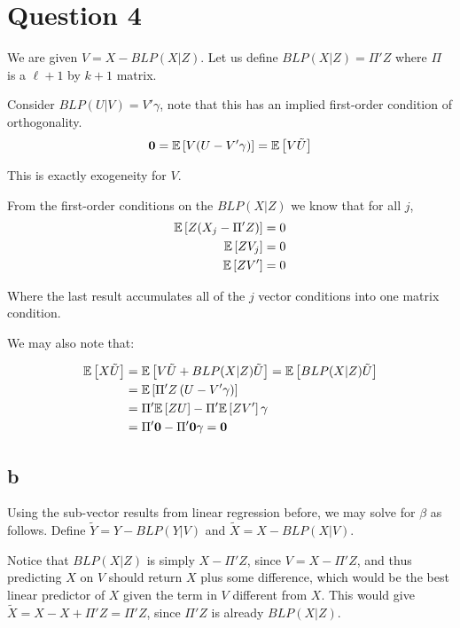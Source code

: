 \documentclass[12pt]{paper}
\begin{document}
\section*{Question 4}

We are given $V = X - BLP(X \vert Z)$. Let us define
$BLP(X \vert Z) = \Pi' Z$ where $\Pi$ is a $\ell+1$ by $k +1$ matrix.

Consider $BLP( U \vert V) = V' \gamma$, note that this has an implied
first-order condition of orthogonality.
\begin{equation*}
  \bm{ 0 } = \mathbb{E} \left [  V ( U - V' \gamma) \right ] = \mathbb{E} \left [  V \tilde{U} \right ]
\end{equation*}

This is exactly exogeneity for $V$.

From the first-order conditions on the $BLP( X \vert Z)$ we know that for
all $j$,
\begin{align*}
  \mathbb{E} \left [  Z ( X_j - \Pi' Z) \right ] &= 0\\
  \mathbb{E} \left [  Z V_j  \right ] &= 0\\
  \mathbb{E} \left [  Z V' \right ] &= 0
\end{align*}

Where the last result accumulates all of the $j$ vector conditions
into one matrix condition.

We may also note that:

\begin{align*}
  \mathbb{E} \left [  X \tilde{U} \right ] &= \mathbb{E} \left [  V \tilde{U} + BLP( X \vert Z) \tilde{U} \right ] =
                       \mathbb{E} \left [  BLP( X \vert Z) \tilde{U} \right ]\\
  &=\mathbb{E} \left [   \Pi' Z \left( U - V'\gamma \right) \right ]\\
  &= \Pi' \mathbb{E} \left [  Z U \right ] - \Pi' \mathbb{E} \left [ Z V' \right ]\gamma\\
  &= \Pi ' \bm{ 0 } - \Pi' \bm{ 0 } \gamma = \bm{ 0 }\\
\end{align*}

\subsection*{b}

Using the sub-vector results from linear regression before, we may
solve for $\beta$ as follows. Define $\tilde{Y} = Y - BLP( Y \vert V)$ and $\tilde{X} = X - BLP( X \vert V)$.

Notice that $BLP( X \vert Z)$  is simply $X-\Pi'Z$, since $V=X-\Pi'Z$, and thus predicting $X$ on $V$ should return $X$ plus some difference, which would be the best linear predictor of $X$ given the term in $V$ different from $X$. This would give $\tilde{X}=X-X+\Pi'Z=\Pi'Z$, since $\Pi'Z$ is already $BLP(X|Z)$.
\end{document}
